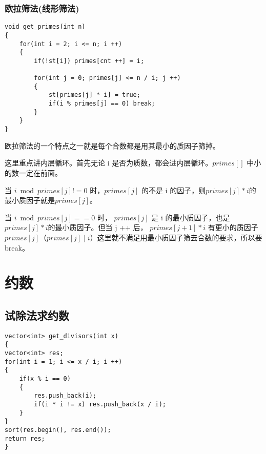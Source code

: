 \documentclass[]{book}
\begin{document}
\subsection{欧拉筛法(线形筛法)}

\begin{lstlisting}
void get_primes(int n)
{
    for(int i = 2; i <= n; i ++)
    {
        if(!st[i]) primes[cnt ++] = i;
        
        for(int j = 0; primes[j] <= n / i; j ++)
        {
            st[primes[j] * i] = true;
            if(i % primes[j] == 0) break;
        }
    }
}
\end{lstlisting}

欧拉筛法的一个特点之一就是每个合数都是用其最小的质因子筛掉。

这里重点讲内层循环。首先无论 i 是否为质数，都会进内层循环。$primes[]$ 中小的数一定在前面。

当 $i \bmod primes[j] != 0$ 时，$primes[j]$ 的不是 i 的因子，则$primes[j] * i$的最小质因子就是$primes[j]$。

当 $i \bmod primes[j] == 0$ 时， $primes[j]$ 是 i 的最小质因子，也是$primes[j] * i$的最小质因子。但当 j ++ 后，
$primes[j + 1] * i$ 有更小的质因子 $primes[j]$（$primes[j] \mid i$）这里就不满足用最小质因子筛去合数的要求，所以要break。

\chapter{约数}
\section{试除法求约数}
\begin{lstlisting}
vector<int> get_divisors(int x)
{
vector<int> res;
for(int i = 1; i <= x / i; i ++)
{
    if(x % i == 0)
    {
        res.push_back(i);
        if(i * i != x) res.push_back(x / i);
    }
}
sort(res.begin(), res.end());
return res;
}
\end{lstlisting}
\end{document}
